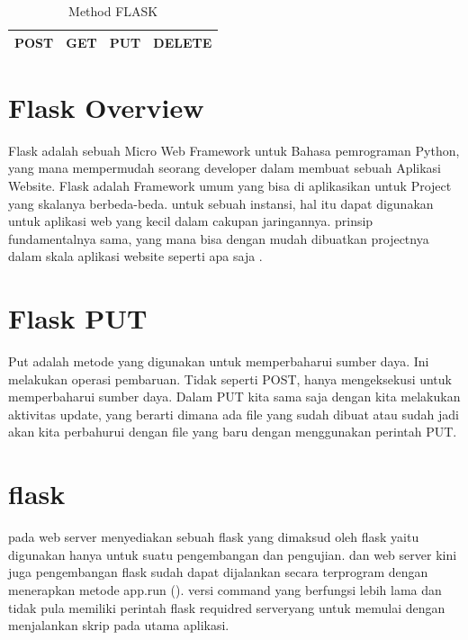 
\begin{table}[ht]
    \caption{Method FLASK}
    \centering
    \begin{tabular}{cccc}
    \hline
    POST&GET&PUT&DELETE\\
    \hline
    \end{tabular}
    \label{tabel}
\end{table}


\section{Flask Overview}
Flask adalah sebuah Micro Web Framework untuk Bahasa pemrograman Python, yang mana  mempermudah
seorang developer dalam membuat sebuah Aplikasi Website. Flask adalah Framework umum
yang bisa di aplikasikan untuk Project yang skalanya berbeda-beda. untuk sebuah 
instansi, hal itu dapat digunakan untuk aplikasi web yang kecil dalam cakupan jaringannya.
prinsip fundamentalnya sama, yang mana bisa dengan mudah dibuatkan projectnya dalam skala aplikasi
website seperti apa saja \cite{alemu2014rest}.

\section{Flask PUT}
Put adalah metode yang digunakan untuk memperbaharui sumber daya. Ini melakukan operasi pembaruan. 
Tidak seperti POST, hanya mengeksekusi untuk memperbaharui sumber daya. Dalam PUT kita sama saja dengan kita 
melakukan aktivitas update, yang berarti dimana ada file yang sudah dibuat atau sudah jadi akan kita perbahurui 
dengan file yang baru dengan menggunakan perintah PUT.

\section{flask}
pada web server menyediakan sebuah flask yang dimaksud oleh flask yaitu digunakan hanya untuk suatu pengembangan dan pengujian. dan web server kini juga pengembangan flask sudah  dapat dijalankan secara terprogram dengan menerapkan metode app.run (). versi command yang  berfungsi lebih lama dan tidak pula memiliki perintah flask requidred serveryang untuk memulai dengan menjalankan skrip pada utama aplikasi.

